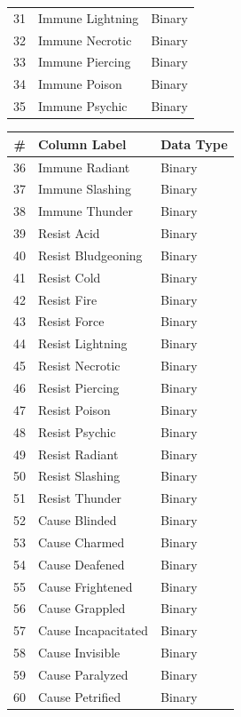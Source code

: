 \documentclass{article}
\begin{document}
\begin{table}[!htbp]
\begin{footnotesize}
\begin{minipage}[b]{0.45\linewidth}
\begin{longtable}[]{@{}rll@{}}
	31 & Immune Lightning & Binary \\
	32 & Immune Necrotic & Binary \\
	33 & Immune Piercing & Binary \\
	34 & Immune Poison & Binary \\
	35 & Immune Psychic & Binary \\
	\bottomrule
\end{longtable}
\end{minipage}
\hspace{0.5cm}
\begin{minipage}[b]{0.45\linewidth}\centering
\begin{longtable}{@{}rll@{}}
	\toprule
	\# & Column Label & Data Type \\
	\midrule
	\endhead
	36 & Immune Radiant & Binary \\
	37 & Immune Slashing & Binary \\
	38 & Immune Thunder & Binary \\
	39 & Resist Acid & Binary \\
	40 & Resist Bludgeoning & Binary \\
	41 & Resist Cold & Binary \\
	42 & Resist Fire & Binary \\
	43 & Resist Force & Binary \\
	44 & Resist Lightning & Binary \\
	45 & Resist Necrotic & Binary \\
	46 & Resist Piercing & Binary \\
	47 & Resist Poison & Binary \\
	48 & Resist Psychic & Binary \\
	49 & Resist Radiant & Binary \\
	50 & Resist Slashing & Binary \\
	51 & Resist Thunder & Binary \\
	52 & Cause Blinded & Binary \\
	53 & Cause Charmed & Binary \\
	54 & Cause Deafened & Binary \\
	55 & Cause Frightened & Binary \\
	56 & Cause Grappled & Binary \\
	57 & Cause Incapacitated & Binary \\
	58 & Cause Invisible & Binary \\
	59 & Cause Paralyzed & Binary \\
	60 & Cause Petrified & Binary \\

\end{longtable}
\end{minipage}
\end{footnotesize}
\end{table}
\end{document}
